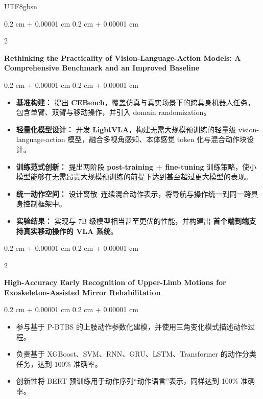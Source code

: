 \documentclass[10pt, letterpaper]{article}
\newenvironment{highlights}{
    \begin{itemize}[
        topsep=0.10 cm,
        parsep=0.10 cm,
        partopsep=0pt,
        itemsep=0pt,
        leftmargin=0.4 cm + 10pt
    ]
}{
    \end{itemize}
} %
\newenvironment{onecolentry}{
    \begin{adjustwidth}{
        0.2 cm + 0.00001 cm
    }{
        0.2 cm + 0.00001 cm
    }
}{
    \end{adjustwidth}
} %
\newenvironment{twocolentry}[2][]{
    \onecolentry
    \def\secondColumn{#2}
    \setcolumnwidth{\fill, 4.5 cm}
    \begin{paracol}{2}
}{
    \switchcolumn \raggedleft \secondColumn
    \end{paracol}
    \endonecolentry
} %
\begin{document}
\begin{CJK*}{UTF8}{gbsn}
\vspace{0.2 cm}

\begin{twocolentry}{}
    \begin{minipage}[t]{\textwidth}
        \justifying
        \textbf{Rethinking the Practicality of Vision-Language-Action Models: A Comprehensive Benchmark and an Improved Baseline}
    \end{minipage}
\end{twocolentry}

\vspace{0.10 cm}
\begin{onecolentry}
    \begin{highlights}
        \item \textbf{基准构建：} 提出 \textbf{CEBench}，覆盖仿真与真实场景下的跨具身机器人任务，包含单臂、双臂与移动操作，并引入 domain randomization。
        \item \textbf{轻量化模型设计：} 开发 \textbf{LightVLA}，构建无需大规模预训练的轻量级 vision-language-action 模型，融合多视角感知、本体感觉 token 化与混合动作块设计。
        \item \textbf{训练范式创新：} 提出两阶段 \textbf{post-training + fine-tuning} 训练策略，使小模型能够在无需昂贵大规模预训练的前提下达到甚至超过更大模型的表现。
        \item \textbf{统一动作空间：} 设计离散--连续混合动作表示，将导航与操作统一到同一跨具身控制框架中。
        \item \textbf{实验结果：} 实现与 7B 级模型相当甚至更优的性能，并构建出 \textbf{首个端到端支持真实移动操作的 VLA 系统}。
    \end{highlights}
\end{onecolentry}

\vspace{0.2 cm}

\begin{twocolentry}{}
    \begin{minipage}[t]{\textwidth}
        \justifying
        \textbf{High-Accuracy Early Recognition of Upper-Limb Motions for Exoskeleton-Assisted Mirror Rehabilitation}
    \end{minipage}
\end{twocolentry}

\vspace{0.10 cm}
\begin{onecolentry}
    \begin{highlights}
        \item 参与基于 P-BTBS 的上肢动作参数化建模，并使用三角变化模式描述动作过程。
        \item 负责基于 XGBoost、SVM、RNN、GRU、LSTM、Transformer 的动作分类任务，达到 100\% 准确率。
        \item 创新性将 BERT 预训练用于动作序列“动作语言”表示，同样达到 100\% 准确率。
    \end{highlights}
\end{onecolentry}


\end{CJK*}
\end{document}
